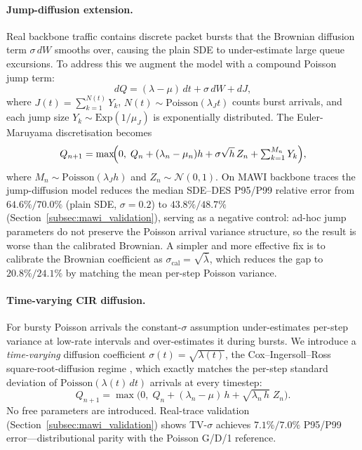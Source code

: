 \documentclass{ieeeaccess}
\begin{document}
\paragraph{Jump-diffusion extension.}
Real backbone traffic contains discrete packet bursts that the Brownian diffusion term $\sigma\,dW$ smooths over, causing the plain SDE to under-estimate large queue excursions. To address this we augment the model with a compound Poisson jump term:
\begin{equation}
    dQ = (\lambda - \mu)\,dt + \sigma\,dW + dJ,
    \label{eq:jump_sde}
\end{equation}
where $J(t) = \sum_{k=1}^{N(t)} Y_k$, $N(t)\sim\mathrm{Poisson}(\lambda_J t)$ counts burst arrivals, and each jump size $Y_k \sim \mathrm{Exp}(1/\mu_J)$ is exponentially distributed. The Euler-Maruyama discretisation becomes
\begin{equation}
    Q_{n+1} = \max\!\Bigl(0,\;Q_n + (\lambda_n - \mu_n)h + \sigma\sqrt{h}\,Z_n + \textstyle\sum_{k=1}^{M_n} Y_k\Bigr),
    \label{eq:jump_euler}
\end{equation}
where $M_n \sim \mathrm{Poisson}(\lambda_J h)$ and $Z_n \sim \mathcal{N}(0,1)$. On MAWI backbone traces the jump-diffusion model reduces the median SDE--DES P95/P99 relative error from $64.6\%/70.0\%$ (plain SDE, $\sigma{=}0.2$) to $43.8\%/48.7\%$ (Section~\ref{subsec:mawi_validation}), serving as a negative control: ad-hoc jump parameters do not preserve the Poisson arrival variance structure, so the result is worse than the calibrated Brownian. A simpler and more effective fix is to calibrate the Brownian coefficient as $\sigma_{\mathrm{cal}}{=}\sqrt{\bar\lambda}$, which reduces the gap to $20.8\%/24.1\%$ by matching the mean per-step Poisson variance.

\paragraph{Time-varying CIR diffusion.}
For bursty Poisson arrivals the constant-$\sigma$ assumption under-estimates per-step variance at
low-rate intervals and over-estimates it during bursts. We introduce a \emph{time-varying}
diffusion coefficient $\sigma(t)=\sqrt{\lambda(t)}$, the Cox--Ingersoll--Ross square-root-diffusion
regime \cite{kang2007}, which exactly matches the per-step standard deviation of
$\mathrm{Poisson}(\lambda(t)\,dt)$ arrivals at every timestep:
\begin{equation}
    Q_{n+1} = \max\!\bigl(0,\; Q_n + (\lambda_n - \mu)\,h + \sqrt{\lambda_n\,h}\;Z_n\bigr).
    \label{eq:tv_sigma}
\end{equation}
No free parameters are introduced. Real-trace validation (Section~\ref{subsec:mawi_validation})
shows TV-$\sigma$ achieves $7.1\%/7.0\%$ P95/P99 error---distributional parity with the
Poisson G/D/1 reference.
\end{document}
